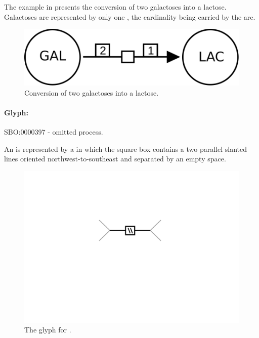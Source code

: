 The example in  presents the conversion of two galactoses into a lactose.  Galactoses are represented by only one , the cardinality being carried by the  arc.

\begin{figure}[htb]
  \centering
  \includegraphics[scale = 0.3]{examples/process-dimerisation}
  \caption{Conversion of two galactoses into a lactose.}
  \label{fig:techref:trans-dim}
\end{figure}



\paragraph{Glyph: }\label{sec:techref:omitted}


\begin{glyphDescription}
 \glyphSboTerm SBO:0000397 - omitted process.

 \glyphNode An  is represented by a  in which the square box contains a two parallel slanted lines oriented northwest-to-southeast and separated by an empty space.
 \end{glyphDescription}

\begin{figure}[htb]
  \centering
  \includegraphics[scale = 0.5]{images/omitted}
  \caption{The \PD glyph for .}
  \label{fig:techref:omitted}
\end{figure}


